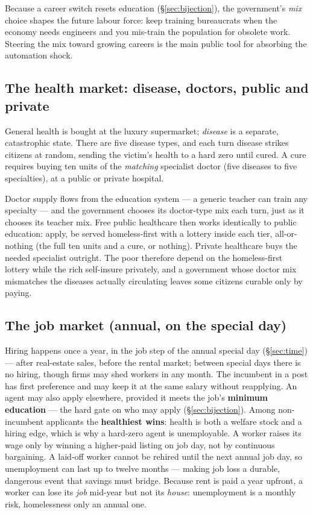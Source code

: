 \documentclass[11pt]{article}
\begin{document}
Because a career switch resets education (\S\ref{sec:bijection}), the
government's \emph{mix} choice shapes the future labour force: keep training
bureaucrats when the economy needs engineers and you mis-train the population
for obsolete work. Steering the mix toward growing careers is the main public
tool for absorbing the automation shock.

\subsection{The health market: disease, doctors, public and private}
\label{sec:health-market}

General health is bought at the luxury supermarket; \emph{disease} is a
separate, catastrophic state. There are five disease types, and each turn
disease strikes citizens at random, sending the victim's health to a hard zero
until cured. A cure requires buying ten units of the \emph{matching} specialist
doctor (five diseases to five specialties), at a public or private hospital.

Doctor supply flows from the education system --- a generic teacher can train
any specialty --- and the government chooses its doctor-type mix each turn, just
as it chooses its teacher mix. Free public healthcare then works identically to
public education: apply, be served homeless-first with a lottery inside each
tier, all-or-nothing (the full ten units and a cure, or nothing). Private
healthcare buys the needed specialist outright. The poor therefore depend on the
homeless-first lottery while the rich self-insure privately, and a government
whose doctor mix mismatches the diseases actually circulating leaves some
citizens curable only by paying.

\subsection{The job market (annual, on the special day)}
\label{sec:job-market}

Hiring happens once a year, in the job step of the annual special day
(\S\ref{sec:time}) --- after real-estate sales, before the rental market; between
special days there is no hiring, though firms may shed workers in any month. The incumbent in a post has
first preference and may keep it at the same salary without reapplying. An agent
may also apply elsewhere, provided it meets the job's \textbf{minimum education}
--- the hard gate on who may apply (\S\ref{sec:bijection}). Among non-incumbent
applicants the \textbf{healthiest wins}: health is both a welfare stock and a
hiring edge, which is why a hard-zero agent is unemployable. A worker raises its
wage only by winning a higher-paid listing on job day, not by continuous
bargaining. A laid-off worker cannot be rehired until the next annual job day, so
unemployment can last up to twelve months --- making job loss a durable,
dangerous event that savings must bridge. Because rent is paid a year upfront, a
worker can lose its \emph{job} mid-year but not its \emph{house}: unemployment is
a monthly risk, homelessness only an annual one.
\end{document}
